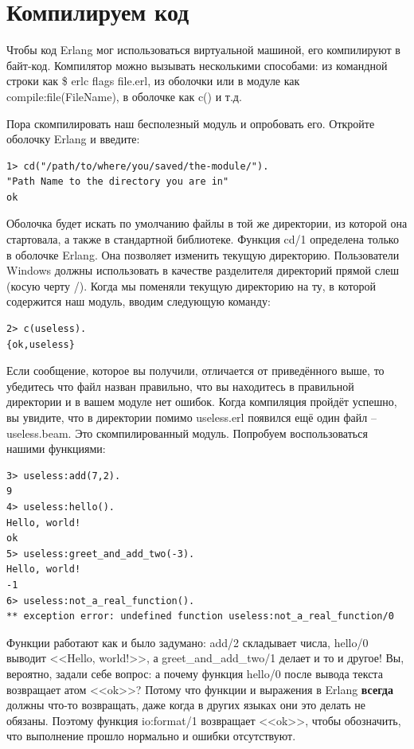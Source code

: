 \documentclass[a4paper,12pt]{report}
\newcommand{\ops}{\colorbox{lgreen}}
\begin{document}
\section{Компилируем код}
Чтобы код Erlang мог использоваться виртуальной машиной, его компилируют в байт\--код. Компилятор можно вызывать несколькими способами: из командной строки как \ops{\$ erlc flags file.erl}, из оболочки или в модуле как \ops{compile:file(FileName)}, в оболочке как \ops{c()} и т.д.

Пора скомпилировать наш бесполезный модуль и опробовать его. Откройте оболочку Erlang и введите:
\begin{lstlisting}[style=erlang]
1> cd("/path/to/where/you/saved/the-module/").
"Path Name to the directory you are in"
ok
\end{lstlisting}

Оболочка будет искать по умолчанию файлы в той же директории, из которой она стартовала, а также в стандартной библиотеке. Функция \ops{cd/1} определена только в оболочке Erlang. Она позволяет изменить текущую директорию. Пользователи Windows должны использовать в качестве разделителя директорий прямой слеш (косую черту \ops{\//}). Когда мы поменяли текущую директорию на ту, в которой содержится наш модуль, вводим следующую команду:
\begin{lstlisting}[style=erlang]
2> c(useless).
{ok,useless}
\end{lstlisting}

Если сообщение, которое вы получили, отличается от приведённого выше, то убедитесь что файл назван правильно, что вы находитесь в правильной директории и в вашем модуле нет ошибок. Когда компиляция пройдёт успешно, вы увидите, что в директории помимо \ops{useless.erl} появился ещё один файл \--- \ops{useless.beam}. Это скомпилированный модуль. Попробуем воспользоваться нашими функциями:
\begin{lstlisting}[style=erlang]
3> useless:add(7,2).
9
4> useless:hello().
Hello, world!
ok
5> useless:greet_and_add_two(-3).
Hello, world!
-1
6> useless:not_a_real_function().
** exception error: undefined function useless:not_a_real_function/0
\end{lstlisting}

Функции работают как и было задумано: \ops{add/2} складывает числа, \ops{hello/0} выводит <<Hello, world!>>, а \ops{greet\_and\_add\_two/1} делает и то и другое! Вы, вероятно, задали себе вопрос: а почему функция \ops{hello/0} после вывода текста возвращает атом <<ok>>? Потому что функции и выражения в Erlang \textbf{всегда} должны что\--то возвращать, даже когда в других языках они это делать не обязаны. Поэтому функция \ops{io:format/1} возвращает <<ok>>, чтобы обозначить, что выполнение прошло нормально и ошибки отсутствуют.
\end{document}

